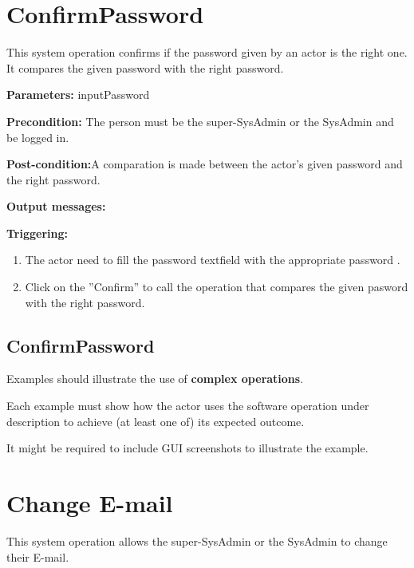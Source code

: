 \section{ConfirmPassword}
\label{operation:ConfirmPassword}
This system operation confirms if the password given by an actor is the right
one. It compares the given password with the right password.

\begin{description}

\item \textbf{Parameters:} inputPassword
\item \textbf{Precondition:} The person must be the super-SysAdmin or the
SysAdmin and be logged in.
\item \textbf{Post-condition:}A comparation is made between the actor's given
password and the right password.
\item \textbf{Output messages:} 


\item \textbf{Triggering:}
\begin{enumerate}
 \item The actor need to fill the password textfield with the appropriate
 password .
\item Click on the ''Confirm'' to call the operation that compares the given
pasword with the right password.

\end{enumerate}

 
\end{description}

 
\subsection{ConfirmPassword}
Examples should illustrate the use of \textbf{complex operations}.

Each example must show how the actor uses the software operation under
description to achieve (at least one of) its expected outcome.

It might be required to include GUI screenshots to illustrate the example.







\section{Change E-mail}
\label{operation:NewEmail}
This system operation allows the super-SysAdmin or the SysAdmin to change
their E-mail.

